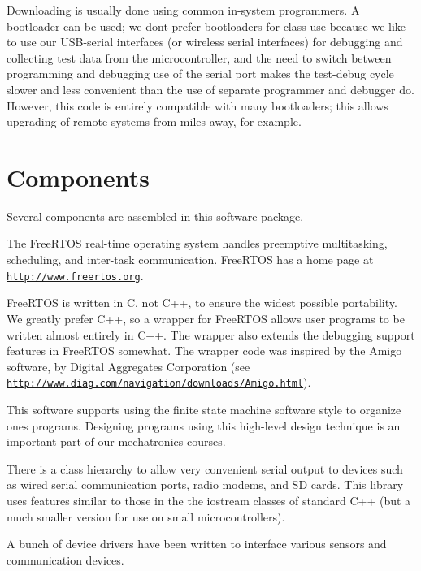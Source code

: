 Downloading is usually done using common in-\/system programmers. A bootloader can be used; we don\textquotesingle{}t prefer bootloaders for class use because we like to use our U\+S\+B-\/serial interfaces (or wireless serial interfaces) for debugging and collecting test data from the microcontroller, and the need to switch between programming and debugging use of the serial port makes the test-\/debug cycle slower and less convenient than the use of separate programmer and debugger do. However, this code is entirely compatible with many bootloaders; this allows upgrading of remote systems from miles away, for example.\hypertarget{index_m_use}{}\section{Components}\label{index_m_use}
Several components are assembled in this software package. \begin{DoxyItemize}
\item The Free\+R\+T\+OS real-\/time operating system handles preemptive multitasking, scheduling, and inter-\/task communication. Free\+R\+T\+OS has a home page at {\ttfamily \href{http://www.freertos.org}{\tt http\+://www.\+freertos.\+org}}. \item Free\+R\+T\+OS is written in C, not C++, to ensure the widest possible portability. We greatly prefer C++, so a wrapper for Free\+R\+T\+OS allows user programs to be written almost entirely in C++. The wrapper also extends the debugging support features in Free\+R\+T\+OS somewhat. The wrapper code was inspired by the Amigo software, by Digital Aggregates Corporation (see {\ttfamily \href{http://www.diag.com/navigation/downloads/Amigo.html}{\tt http\+://www.\+diag.\+com/navigation/downloads/\+Amigo.\+html}}). \item This software supports using the finite state machine software style to organize one\textquotesingle{}s programs. Designing programs using this high-\/level design technique is an important part of our mechatronics courses. \item There is a class hierarchy to allow very convenient serial output to devices such as wired serial communication ports, radio modems, and SD cards. This library uses features similar to those in the the {\ttfamily iostream} classes of standard C++ (but a much smaller version for use on small microcontrollers). \item A bunch of device drivers have been written to interface various sensors and communication devices.\end{DoxyItemize}
